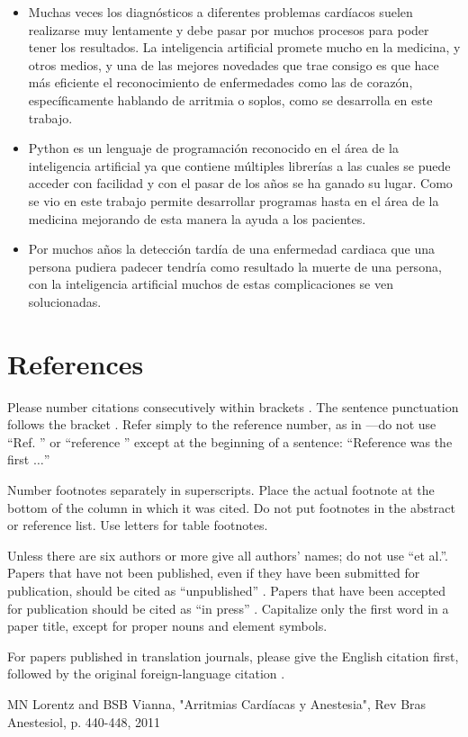 \documentclass[conference]{IEEEtran}
\begin{document}
\begin{itemize}
\item Muchas veces los diagnósticos a diferentes problemas cardíacos suelen realizarse muy lentamente y debe pasar por muchos procesos para poder tener los resultados. La inteligencia artificial promete mucho en la medicina, y otros medios, y una de las mejores novedades que trae consigo es que hace más eficiente el reconocimiento de enfermedades como las de corazón, específicamente hablando de arritmia o soplos, como se desarrolla en este trabajo.
\item Python es un lenguaje de programación reconocido en el área de la inteligencia artificial ya que contiene múltiples librerías a las cuales se puede acceder con facilidad y con el pasar de los años se ha ganado su lugar. Como se vio en este trabajo permite desarrollar programas hasta en el área de la medicina mejorando de esta manera la ayuda a los pacientes.
\item Por muchos años la detección tardía de una enfermedad cardiaca que una persona pudiera padecer tendría como resultado la muerte de una persona, con la inteligencia artificial muchos de estas complicaciones se ven solucionadas.
\end{itemize} 

\section*{References}

Please number citations consecutively within brackets \cite{b1}. The 
sentence punctuation follows the bracket \cite{b2}. Refer simply to the reference 
number, as in \cite{b3}---do not use ``Ref. \cite{b3}'' or ``reference \cite{b3}'' except at 
the beginning of a sentence: ``Reference \cite{b3} was the first $\ldots$''

Number footnotes separately in superscripts. Place the actual footnote at 
the bottom of the column in which it was cited. Do not put footnotes in the 
abstract or reference list. Use letters for table footnotes.

Unless there are six authors or more give all authors' names; do not use 
``et al.''. Papers that have not been published, even if they have been 
submitted for publication, should be cited as ``unpublished'' \cite{b4}. Papers 
that have been accepted for publication should be cited as ``in press'' \cite{b5}. 
Capitalize only the first word in a paper title, except for proper nouns and 
element symbols.

For papers published in translation journals, please give the English 
citation first, followed by the original foreign-language citation \cite{b6}.

\begin{thebibliography}{00}
 MN Lorentz and BSB Vianna, "Arritmias Cardíacas y Anestesia", Rev Bras Anestesiol, p. 440-448, 2011

\end{thebibliography}
\vspace{12pt}
\color{red}
\end{document}
